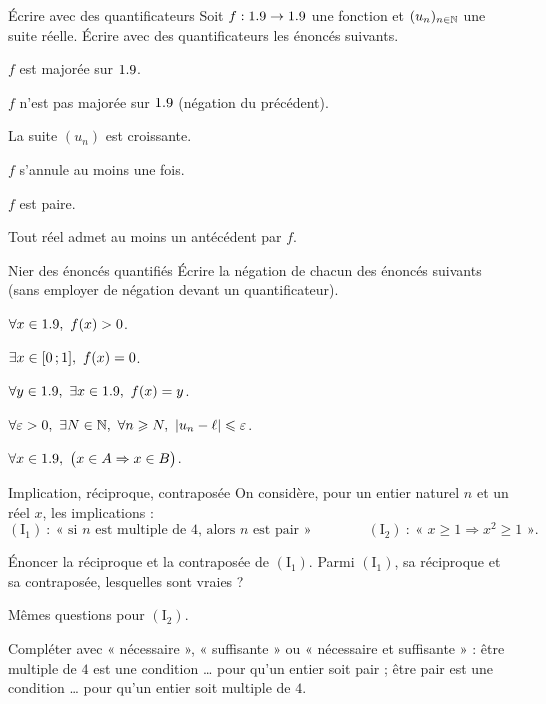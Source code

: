 \begin{exercice}[1]{Écrire avec des quantificateurs}
Soit $f:1.9\to1.9$ une fonction et $(u_n)_{n\in\mathbb{N}}$ une suite réelle. Écrire
avec des quantificateurs les énoncés suivants.
\begin{questions}
  \item $f$ est majorée sur $1.9$.
  \item $f$ n'est pas majorée sur $1.9$ (négation du précédent).
  \item La suite $(u_n)$ est croissante.
  \item $f$ s'annule au moins une fois.
  \item $f$ est paire.
  \item Tout réel admet au moins un antécédent par $f$.
\end{questions}
\end{exercice}

\begin{exercice}[1]{Nier des énoncés quantifiés}
Écrire la négation de chacun des énoncés suivants (sans employer de négation
devant un quantificateur).
\begin{questions}
  \item $\forall x\in1.9,\ f(x)>0$.
  \item $\exists x\in\intFF{0}{1},\ f(x)=0$.
  \item $\forall y\in\R,\ \exists x\in\R,\ f(x)=y$.
  \item $\forall\varepsilon>0,\ \exists N\in\N,\ \forall n\geq N,\ |u_n-\ell|\leq\varepsilon$.
  \item $\forall x\in1.9,\ \bigl(x\in A\Rightarrow x\in B\bigr)$.
\end{questions}
\end{exercice}

\begin{exercice}[1]{Implication, réciproque, contraposée}
On considère, pour un entier naturel $n$ et un réel $x$, les implications :
\[
  (\mathrm{I}_1)\ :\ \text{« si $n$ est multiple de $4$, alors $n$ est pair »}
  \qquad\qquad
  (\mathrm{I}_2)\ :\ \text{« } x\geq1\Rightarrow x^{2}\geq1\text{ »}.
\]
\begin{questions}
  \item Énoncer la réciproque et la contraposée de $(\mathrm{I}_1)$.
    Parmi $(\mathrm{I}_1)$, sa réciproque et sa contraposée, lesquelles sont vraies ?
  \item Mêmes questions pour $(\mathrm{I}_2)$.
  \item Compléter avec « nécessaire », « suffisante » ou « nécessaire et
    suffisante » : être multiple de $4$ est une condition \ldots{} pour qu'un
    entier soit pair ; être pair est une condition \ldots{} pour qu'un entier
    soit multiple de $4$.
\end{questions}
\end{exercice}

